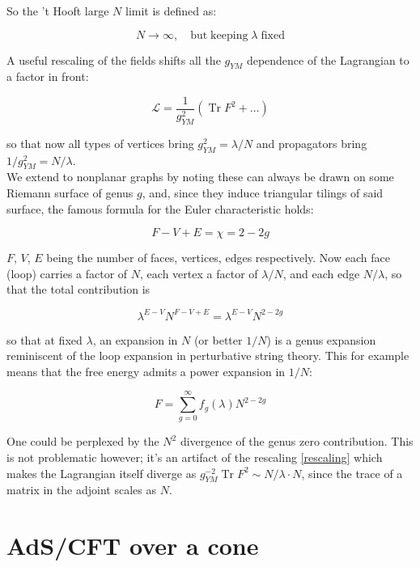 \documentclass[11pt,a4paper,oneside,openright,titlepage]{book}
\DeclareMathOperator{\Tr}{Tr}
\begin{document}
So the 't Hooft large $N$ limit is defined as:

\begin{equation}
N \rightarrow \infty, \quad \mathrm{but \; keeping } \; \lambda \; \mathrm{fixed}
\end{equation}

A useful rescaling of the fields shifts all the $g_{YM}$ dependence of the Lagrangian to a factor in front:

\begin{equation} \label{rescaling} \mathcal{L} = \frac{1}{g_{YM}^2} \left( \Tr F^2 + \ldots \right) \end{equation}

so that now all types of vertices bring $g_{YM}^2 = \lambda/N$ and propagators bring $1/g_{YM}^2 = N/\lambda$.\\

We extend to nonplanar graphs by noting these can always be drawn on some Riemann surface of genus $g$, and, since they induce triangular tilings of said surface, the famous formula for the Euler characteristic holds:

\[ F - V + E = \chi = 2 - 2g \]

$F$, $V$, $E$ being the number of faces, vertices, edges respectively. Now each face (loop) carries a factor of $N$, each vertex a factor of $\lambda/N$, and each edge $N/\lambda$, so that the total contribution is

\[ \lambda^{E-V} N^{F-V+E} = \lambda^{E-V} N^{2-2g} \]

so that at fixed $\lambda$, an expansion in $N$ (or better $1/N$) is a genus expansion reminiscent of the loop expansion in perturbative string theory. This for example means that the free energy admits a power expansion in $1/N$:

\begin{equation}
F = \sum_{g=0}^\infty f_g(\lambda) N^{2-2g}
\end{equation}

One could be perplexed by the $N^2$ divergence of the genus zero contribution. This is not problematic however; it's an artifact of the rescaling \ref{rescaling} which makes the Lagrangian itself diverge as $g_{YM}^{-2} \Tr F^2 \sim N/\lambda \cdot N$, since the trace of a matrix in the adjoint scales as $N$.

\section{AdS/CFT over a cone}
\end{document}
